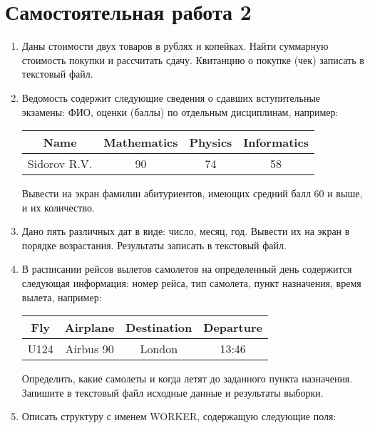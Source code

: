 \section{Самостоятельная работа 2}
\begin{enumerate}[leftmargin=*]
    \item Даны стоимости двух товаров в рублях и копейках. Найти суммарную стоимость покупки и рассчитать сдачу. Квитанцию о покупке (чек) записать в текстовый файл.
    \item Ведомость содержит следующие сведения о сдавших вступительные экзамены: ФИО, оценки (баллы) по отдельным дисциплинам, например:
    \begin{table}[H]
        \centering
        \renewcommand{\arraystretch}{1.5}
        \renewcommand{\tabcolsep}{1cm}
        \begin{tabular}{|c|c|c|c|}
            \hline
            \textbf{Name} & \textbf{Mathematics} & \textbf{Physics} & \textbf{Informatics} \\
            \hline
            Sidorov R.V. & 90 & 74 & 58 \\
            \hline
        \end{tabular}
    \end{table}
    Вывести на экран фамилии абитуриентов, имеющих средний балл 60 и выше, и их количество.
    \item Дано пять различных дат в виде: число, месяц, год. Вывести их на экран в порядке возрастания. Результаты записать в текстовый файл.
    \item В расписании рейсов вылетов самолетов на определенный день содержится следующая информация: номер рейса, тип самолета, пункт назначения, время вылета, например:
    \begin{table}[H]
        \centering
        \renewcommand{\arraystretch}{1.5}
        \renewcommand{\tabcolsep}{1.2cm}
        \begin{tabular}{|c|c|c|c|}
            \hline
            \textbf{Fly} & \textbf{Airplane} & \textbf{Destination} & \textbf{Departure} \\
            \hline
            U124 & Airbus 90 & London & 13:46 \\
            \hline
        \end{tabular}
    \end{table}
    Определить, какие самолеты и когда летят до заданного пункта назначения. Запишите в текстовый файл исходные данные и результаты выборки.
    \item Описать структуру с именем WORKER, содержащую следующие поля:

\end{enumerate}
